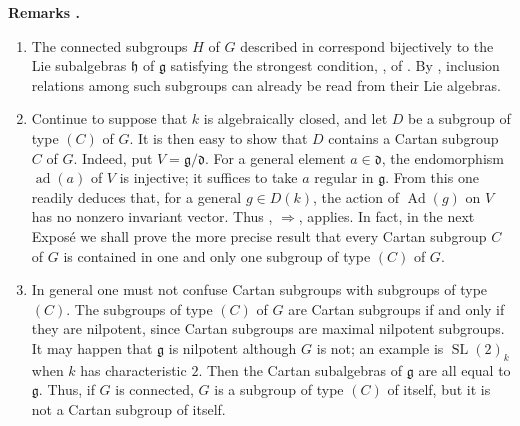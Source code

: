 \par\medskip
\noindent{}%
\textbf{Remarks \thetheorem.}
\begin{enumerate}
  \item[a)]
  The connected subgroups \(H\) of \(G\) described in
   correspond bijectively to the Lie subalgebras
  \(\mathfrak h\) of \(\mathfrak g\) satisfying the strongest
  condition, , of . By , inclusion
  relations among such subgroups can already be read from their Lie
  algebras.

  \item[b)]
  Continue to suppose that \(k\) is algebraically closed, and let
  \(D\) be a subgroup of type \((C)\) of \(G\). It is then easy to
  show that \(D\) contains a Cartan subgroup \(C\) of \(G\). Indeed,
  put \(V=\mathfrak g/\mathfrak d\). For a general element
  \(a\in\mathfrak d\), the endomorphism
  \(\operatorname{ad}(a)\) of \(V\) is injective; it suffices to take
  \(a\) regular in \(\mathfrak g\). From this one readily deduces that,
  for a general \(g\in D(k)\), the action of
  \(\operatorname{Ad}(g)\) on \(V\) has no nonzero invariant vector.
  Thus , \(\Rightarrow\), applies. In fact, in the next
  Exposé we shall prove the more precise result that every Cartan
  subgroup \(C\) of \(G\) is contained in one and only one subgroup
  of type \((C)\) of \(G\).

  \item[c)]
  In general one must not confuse Cartan subgroups with subgroups of
  type \((C)\). The subgroups of type \((C)\) of \(G\) are Cartan
  subgroups if and only if they are nilpotent, since Cartan subgroups
  are maximal nilpotent subgroups. It may happen that \(\mathfrak g\)
  is nilpotent although \(G\) is not; an example is
  \(\operatorname{SL}(2)_k\) when \(k\) has characteristic \(2\).
  Then the Cartan subalgebras of \(\mathfrak g\) are all equal to
  \(\mathfrak g\). Thus, if \(G\) is connected, \(G\) is a subgroup
  of type \((C)\) of itself, but it is not a Cartan subgroup of
  itself.


\end{enumerate}
